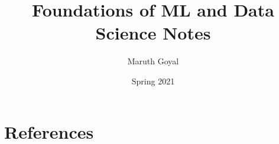 \documentclass{article}
\title{Foundations of ML and Data Science Notes}
\author{Maruth Goyal}
\date{Spring 2021}
\begin{document}
\maketitle
\tableofcontents












\section{References}


\end{document}
